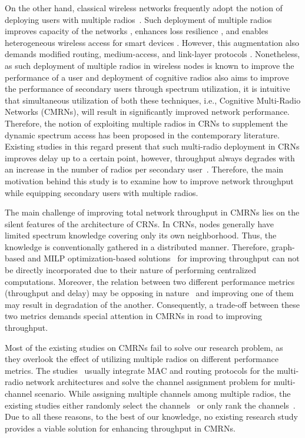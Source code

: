 On the other hand, classical wireless networks frequently adopt the notion of deploying users with multiple radios~\cite{bahl2004reconsidering, adya2004multi}. Such deployment of multiple radios improves capacity of the networks \cite{draves2004routing, bahl2004reconsidering}, enhances loss resilience \cite{miu2005improving}, and enables heterogeneous wireless access for smart devices \cite{song2012performance}. However, this augmentation also demands modified routing, medium-access, and link-layer protocols \cite{kyasanur2006routing, chatterjee2013low}. Nonetheless, as such deployment of multiple radios in wireless nodes is known to improve the performance of a user and  deployment of cognitive radios also aims to improve the performance of secondary users through spectrum utilization, it is intuitive that simultaneous utilization of both these techniques, i.e., Cognitive Multi-Radio Networks (CMRNs), will result in significantly improved network performance. Therefore, the notion of exploiting multiple radios in CRNs to supplement the dynamic spectrum access has been proposed in the contemporary literature. Existing studies in this regard present that such multi-radio deployment in CRNs improves delay up to a certain point, however, throughput always degrades with an increase in the number of radios per secondary user~\cite{khan2015towards}. Therefore, the main motivation behind this study is to examine how to improve network throughput while equipping secondary users with multiple radios.

The main challenge of improving total network throughput in CMRNs lies on the silent features of the architecture of CRNs. In CRNs, nodes generally have limited spectrum knowledge covering only its own neighborhood. Thus, the knowledge is conventionally gathered in a distributed manner. Therefore, graph-based and MILP optimization-based solutions~\cite{hoang2008downlink,ahmed2014channel} for improving throughput can not be directly incorporated due to their nature of performing centralized computations. Moreover, the relation between two different performance metrics (throughput and delay) may be opposing in nature~\cite{gamal2004throughput} and improving one of them may result in degradation of the another. Consequently, a trade-off between these two metrics demands special attention in CMRNs in road to improving throughput.

Most of the existing studies on CMRNs fail to solve our research problem, as they overlook the effect of utilizing multiple radios on different performance metrics. The studies~\cite{de2012survey, feng2009joint, zhong2014capacity, li2014deterministic} usually integrate MAC and routing protocols for the multi-radio network architectures and solve the channel assignment problem for multi-channel scenario. While assigning multiple channels among multiple radios, the existing studies either randomly select the channels~\cite{khan2015towards} or only rank the channels~\cite{zhong2014capacity}. Due to all these reasons, to the best of our knowledge, no existing research study provides a viable solution for enhancing throughput in CMRNs.

